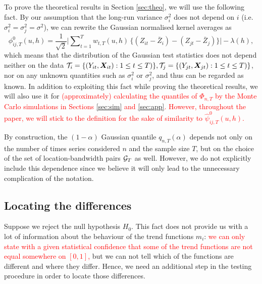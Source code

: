 \documentclass[a4paper,12pt]{article}
\makeatletter
\renewcommand{\eqref}[1]{\tagform@{\ref{#1}}}
\makeatother
\begin{document}
\begin{remark}\label{rem:simpl}
To prove the theoretical results in Section \ref{sec:theo}, we will use the following fact. By our assumption that the long-run variance $\sigma_i^2$ does not depend on $i$ \linebreak (i.e. $\sigma_i^2 = \sigma^2_j = \sigma^2$), we can rewrite the Gaussian normalised kernel averages \eqref{eq:phi_zero_ij} as
\[\phi^0_{ij, T}(u, h) = \frac{1}{\sqrt{2}} \Big|\sum\nolimits_{t=1}^T w_{t,T}(u, h) \, \big\{ (Z_{it} - \bar{Z}_i) - (Z_{jt} - \bar{Z}_j) \big\}\Big| - \lambda(h), \] 
which means that the distribution of the Gaussian test statistics does not depend neither on the data $\mathcal{T}_i =\{ (Y_{it}, \boldsymbol{X}_{it}) : 1\leq t \leq T)\}, \mathcal{T}_j =\{ (Y_{jt}, \boldsymbol{X}_{jt}) : 1\leq t \leq T)\}$, nor on any unknown quantities such as $\sigma^2_i$ or $\sigma_j^2$, and thus can be regarded as known. In addition to exploiting this fact while proving the theoretical results, we will also use it for \textcolor{red}{(approximately) calculating the quantiles of $\Phi_{n, T}$ by the Monte Carlo simulations in Sections \ref{sec:sim} and \ref{sec:app}. However, throughout the paper, we will stick to the definition \eqref{eq:phi_zero_ij} for the sake of similarity to $\hat{\psi}^0_{ij, T}(u, h)$.}%
\end{remark}

\begin{remark}
By construction, the $(1-\alpha)$ Gaussian quantile $q_{n, T}(\alpha)$ depends not only on the number of times series considered $n$ and the sample size $T$, but on the choice of the set of location-bandwidth pairs $\mathcal{G}_T$ as well. However, we do not explicitly include this dependence since we believe it will only lead to the unnecessary complication of the notation. 
\end{remark}

\subsection{Locating the differences}\label{subsec:test:loc}

Suppose we reject the null hypothesis $H_0$. This fact does not provide us with a lot of information about the behaviour of the trend functions $m_i$: \textcolor{red}{we can only state with a given statistical confidence that some of the trend functions are not equal somewhere on $[0, 1]$,} but we can not tell which of the functions are different and where they differ. Hence, we need an additional step in the testing procedure in order to locate those differences.
\end{document}
